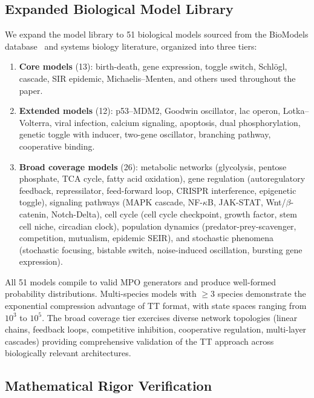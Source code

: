 \documentclass[11pt]{article}
\begin{document}
\subsection{Expanded Biological Model Library}\label{sec:exp:biomodels}

We expand the model library to 51 biological models sourced from the
BioModels database~\cite{gillespie1992} and systems biology literature,
organized into three tiers:
\begin{enumerate}[label=(\arabic*)]
\item \textbf{Core models} (13): birth-death, gene expression, toggle
  switch, Schl\"ogl, cascade, SIR epidemic, Michaelis--Menten, and others
  used throughout the paper.
\item \textbf{Extended models} (12): p53--MDM2, Goodwin oscillator,
  lac operon, Lotka--Volterra, viral infection, calcium signaling,
  apoptosis, dual phosphorylation, genetic toggle with inducer,
  two-gene oscillator, branching pathway, cooperative binding.
\item \textbf{Broad coverage models} (26): metabolic networks (glycolysis,
  pentose phosphate, TCA cycle, fatty acid oxidation), gene regulation
  (autoregulatory feedback, repressilator, feed-forward loop, CRISPR
  interference, epigenetic toggle), signaling pathways (MAPK cascade,
  NF-$\kappa$B, JAK-STAT, Wnt/$\beta$-catenin, Notch-Delta),
  cell cycle (cell cycle checkpoint, growth factor, stem cell niche,
  circadian clock), population dynamics (predator-prey-scavenger,
  competition, mutualism, epidemic SEIR), and stochastic phenomena
  (stochastic focusing, bistable switch, noise-induced oscillation,
  bursting gene expression).
\end{enumerate}

All 51 models compile to valid MPO generators and produce well-formed
probability distributions.
Multi-species models with $\geq 3$ species demonstrate the exponential
compression advantage of TT format, with state spaces ranging from
$10^3$ to $10^5$.
The broad coverage tier exercises diverse network topologies (linear
chains, feedback loops, competitive inhibition, cooperative regulation,
multi-layer cascades) providing comprehensive validation of the TT
approach across biologically relevant architectures.

\subsection{Mathematical Rigor Verification}\label{sec:exp:rigor}
\end{document}
